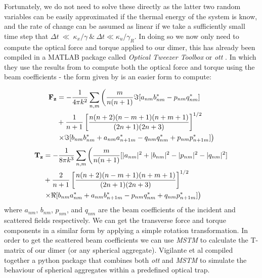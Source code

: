 Fortunately, we do not need to solve these directly as the latter two
random variables can be easily approximated if the thermal energy of
the system is know, and the rate of change can be assumed as linear if
we take a sufficiently small time step that
$\Delta t~\ll~\kappa_x/\gamma \ \& \ \Delta t \ll
\kappa_u/\gamma_R$. In doing so we now only need to compute the
optical force and torque applied to our dimer, this has already been
compiled in a MATLAB package called \textit{Optical Tweezer Toolbox}
or \textit{ott} \cite{Nieminen2007}. In which they use the results
from \cite{Farsund1996} to compute both the optical force and torque
using the beam coefficients - the form given by
\cite{Crichton2000THEMD} is an easier form to compute:

\begin{equation}
\begin{split}
  \bold{F_z}
  &=
    -\frac{1}{4\pi k^2}\sum_{n,m} \left(\frac{m}{n(n+1)}\Im[a_{nm}b^*_{nm}-p_{nm}q^*_{nm}] \right.
  \\ 
  &+\frac{1}{n+1}\left[\frac{n(n+2)(n-m+1)(n+m+1)}{(2n+1)(2n+3)} \right]^{1/2}
  \\
  & \left.\times\Im[b_{nm}b^*_{nm}+a_{nm}a^*_{n+1m}-q_{nm}q^*_{nm}+p_{nm}p^*_{n+1m}] \right)
\end{split}
\end{equation}
\begin{equation}
\begin{split}
  \bold{T_z}
  &=
    -\frac{1}{8\pi k^3}\sum_{n,m} \left(\frac{m}{n(n+1)}[|a_{nm}|^2+|b_{nm}|^2-|p_{nm}|^2-|q_{nm}|^2] \right.
  \\ 
  &+\frac{2}{n+1}\left[\frac{n(n+2)(n-m+1)(n+m+1)}{(2n+1)(2n+3)} \right]^{1/2}
  \\
  & \left.\times\Re[b_{nm}a^*_{nm}+a_{nm}b^*_{n+1m}-p_{nm}q^*_{nm}+q_{nm}p^*_{n+1m}] \right)
\end{split}
\end{equation}
where $a_{nm}$, $b_{nm}$, $p_{nm}$, and $q_{nm}$ are the beam coefficients of the incident and scattered fields respectively. We can get the transverse force and torque components in a similar form by applying a simple rotation transformation. In order to get the scattered beam coefficients we can use \textit{MSTM} \cite{Mackowski2011} to calculate the T-matrix of our dimer (or any spherical aggregate). Vigilante et al compiled together a python package that combines both \textit{ott} and \textit{MSTM} to simulate the behaviour of spherical aggregates within a predefined optical trap. 

